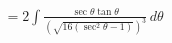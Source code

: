 \documentclass[preview]{standalone}
\begin{document}
\begin{align*}
&=2\int \frac{\sec\theta\tan\theta}{(\sqrt{16(\sec^2\theta-1)})^3} \, d\theta \\
\end{align*}
\end{document}
